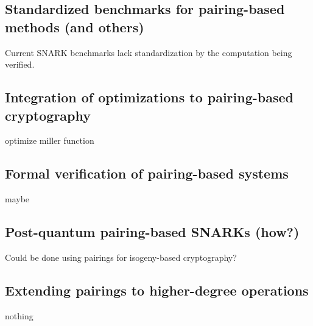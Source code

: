 \subsection{Standardized benchmarks for pairing-based methods (and others)}
\noindent Current SNARK benchmarks lack standardization by the computation being verified.\\

\subsection{Integration of optimizations to pairing-based cryptography}
\noindent optimize miller function\\

\subsection{Formal verification of pairing-based systems}
\noindent maybe\\

\subsection{Post-quantum pairing-based SNARKs (how?)}
\noindent Could be done using pairings for isogeny-based cryptography?\\

\subsection{Extending pairings to higher-degree operations}
\noindent nothing\\

